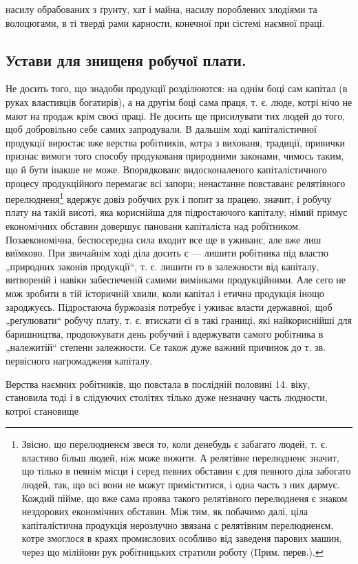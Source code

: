 \parcont{}
насилу обрабованих з ґрунту, хат і майна, насилу пороблених
злодіями та волоцюгами, в ті тверді рами карности,
конечної при сістемі наємної праці.

\subsection{Устави для знищеня робучої плати.}

Не досить того, що знадоби продукції розділюются:
на однім боці сам капітал (в руках властивців богатирів),
а на другім боці сама праця, т. є. люде, котрі нічо не мают
на продаж крім своєї праці. Не досить ще присилувати
тих людей до того, щоб добровільно себе самих запродували.
В дальшім ході капіталістичної продукції виростає
вже верства робітників, котра з вихованя, традиції, привички
признає вимоги того способу продукованя природними законами,
чимось таким, що й бути інакше не може. Впорядкованє
видосконаленого капіталістичного процесу продукційного
перемагає всі запори; ненастанне повставанє релятівного
перелюдненя\footnote*{
Звісно, що перелюдненєм звеся то, коли денебудь є забагато
людей, т. є. властиво більш людей, ніж може вижити. А релятівне перелюдненє
значит, що тілько в певнім місци і серед певних обставин є для
певного діла забогато людей, так, що всі вони не можут приміститися,
і одна часть з них дармує. Кождий пійме, що вже сама проява такого
релятівного перелюдненя є знаком нездорових економічних обставин.
Між тим, як побачимо далі, ціла капіталістична продукція нерозлучно
звязана с релятівним перелюдненєм, котре змоглося в краях промислових
особливо від заведеня парових машин, через що мілійони рук робітницьких
стратили роботу (Прим. перев.).
} вдержує довіз робучих рук і попит
за працею, значит, і робучу плату на такій висоті, яка кориснійша
для підростаючого капіталу; німий примус економічних
обставин довершує панованя капіталіста над робітником.
Позаекономічна, беспосередна сила входит все ще
в уживанє, але вже лиш виїмково. При звичайнім ході діла
досить є — лишити робітника під властю „природних законів
продукції“, т. є. лишити го в залежности від капіталу,
витвореній і навіки забеспеченій самими вимінками
продукційними. Але сего не мож зробити в тій історичній
хвили, коли капітал і етична продукція інощо зароджуєсь.
Підростаюча буржоазія потребує і уживає власти державної,
щоб „реґулювати“ робучу плату, т. є. втискати єї в такі
границі, які найкориснійші для баришництва, продовжувати
день робучий і вдержувати самого робітника в „належитій“
степени залежности. Се також дуже важний причинок до
т. зв. первісного нагромадженя капіталу.

Верства наємних робітників, що повстала в послідній
половині 14. віку, становила тоді і в слідуючих столітях
тілько дуже незначну часть людности, котрої становище
\parbreak{}
